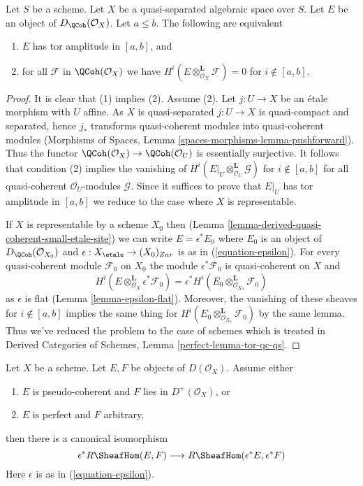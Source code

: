 \begin{lemma}
\label{lemma-tor-qc-qs}
Let $S$ be a scheme. Let $X$ be a quasi-separated algebraic space over $S$.
Let $E$ be an object of $D_\QCoh(\mathcal{O}_X)$. Let $a \leq b$.
The following are equivalent
\begin{enumerate}
\item $E$ has tor amplitude in $[a, b]$, and
\item for all $\mathcal{F}$ in $\QCoh(\mathcal{O}_X)$
we have $H^i(E \otimes_{\mathcal{O}_X}^\mathbf{L} \mathcal{F}) = 0$
for $i \not \in [a, b]$.
\end{enumerate}
\end{lemma}

\begin{proof}
It is clear that (1) implies (2). Assume (2). Let $j : U \to X$ be
an \'etale morphism with $U$ affine. As $X$ is quasi-separated $j : U \to X$
is quasi-compact and separated, hence $j_*$ transforms quasi-coherent
modules into quasi-coherent modules (Morphisms of Spaces, Lemma
\ref{spaces-morphisms-lemma-pushforward}).
Thus the functor
$\QCoh(\mathcal{O}_X) \to \QCoh(\mathcal{O}_U)$
is essentially surjective. It follows that condition (2)
implies the vanishing of
$H^i(E|_U \otimes_{\mathcal{O}_U}^\mathbf{L} \mathcal{G})$
for $i \not \in [a, b]$ for all quasi-coherent $\mathcal{O}_U$-modules
$\mathcal{G}$. Since it suffices to prove that $E|_U$ has tor amplitude
in $[a, b]$ we reduce to the case where $X$ is representable.

\medskip\noindent
If $X$ is representable by a scheme $X_0$ then
(Lemma \ref{lemma-derived-quasi-coherent-small-etale-site})
we can write $E = \epsilon^*E_0$ where $E_0$ is an object of
$D_\QCoh(\mathcal{O}_{X_0})$ and
$\epsilon : X_\etale \to (X_0)_{Zar}$ is as in
(\ref{equation-epsilon}). For every quasi-coherent module
$\mathcal{F}_0$ on $X_0$ the module $\epsilon^*\mathcal{F}_0$
is quasi-coherent on $X$ and
$$
H^i(E \otimes_{\mathcal{O}_X}^\mathbf{L} \epsilon^*\mathcal{F}_0)
=
\epsilon^*H^i(E_0 \otimes_{\mathcal{O}_{X_0}}^\mathbf{L} \mathcal{F}_0)
$$
as $\epsilon$ is flat (Lemma \ref{lemma-epsilon-flat}).
Moreover, the vanishing of these sheaves for $i \not \in [a, b]$
implies the same thing for
$H^i(E_0 \otimes_{\mathcal{O}_{X_0}}^\mathbf{L} \mathcal{F}_0)$
by the same lemma. Thus we've reduced the problem to the case
of schemes which is treated in
Derived Categories of Schemes, Lemma \ref{perfect-lemma-tor-qc-qs}.
\end{proof}

\begin{lemma}
\label{lemma-descend-RHom}
Let $X$ be a scheme. Let $E, F$ be objects of $D(\mathcal{O}_X)$.
Assume either
\begin{enumerate}
\item $E$ is pseudo-coherent and $F$ lies in $D^+(\mathcal{O}_X)$, or
\item $E$ is perfect and $F$ arbitrary,
\end{enumerate}
then there is a canonical isomorphism
$$
\epsilon^*R\SheafHom(E, F) \longrightarrow R\SheafHom(\epsilon^*E, \epsilon^*F)
$$
Here $\epsilon$ is as in (\ref{equation-epsilon}).
\end{lemma}

